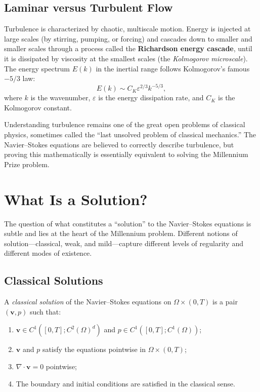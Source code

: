 \subsection{Laminar versus Turbulent Flow}

Turbulence is characterized by chaotic, multiscale motion. Energy is injected at large scales (by stirring, pumping, or forcing) and cascades down to smaller and smaller scales through a process called the \textbf{Richardson energy cascade}, until it is dissipated by viscosity at the smallest scales (the \emph{Kolmogorov microscale}). The energy spectrum $E(k)$ in the inertial range follows Kolmogorov's famous $-5/3$ law:
\[
E(k) \sim C_K \varepsilon^{2/3} k^{-5/3},
\]
where $k$ is the wavenumber, $\varepsilon$ is the energy dissipation rate, and $C_K$ is the Kolmogorov constant.

Understanding turbulence remains one of the great open problems of classical physics, sometimes called the ``last unsolved problem of classical mechanics.'' The Navier--Stokes equations are believed to correctly describe turbulence, but proving this mathematically is essentially equivalent to solving the Millennium Prize problem.

\section{What Is a Solution?}
\label{sec:NS-solutions}

The question of what constitutes a ``solution'' to the Navier--Stokes equations is subtle and lies at the heart of the Millennium problem. Different notions of solution---classical, weak, and mild---capture different levels of regularity and different modes of existence.

\subsection{Classical Solutions}

\begin{definition}
A \textit{classical solution} of the Navier--Stokes equations on $\Omega \times (0, T)$ is a pair $(\mathbf{v}, p)$ such that:
\begin{enumerate}
\item $\mathbf{v} \in C^1([0, T]; C^2(\Omega)^d)$ and $p \in C^1([0, T]; C^1(\Omega))$;
\item $\mathbf{v}$ and $p$ satisfy the equations pointwise in $\Omega \times (0, T)$;
\item $\nabla \cdot \mathbf{v} = 0$ pointwise;
\item The boundary and initial conditions are satisfied in the classical sense.
\end{enumerate}
\end{definition}

